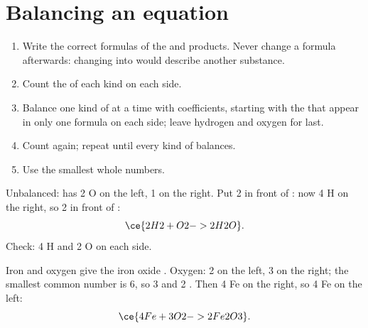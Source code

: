 \section{Balancing an equation}

\begin{method}\label{met:g8:balanced-equations:balance}
\begin{enumerate}
  \item Write the correct formulas of the  and products. Never
        change a formula afterwards: changing  into 
        would describe another substance.
  \item Count the  of each kind on each side.
  \item Balance one kind of  at a time with coefficients, starting
        with the  that appear in only one formula on each side;
        leave hydrogen and oxygen for last.
  \item Count again; repeat until every kind of  balances.
  \item Use the smallest whole numbers.
\end{enumerate}
\end{method}

\begin{example}\label{ex:g8:balanced-equations:water}
Unbalanced:  %
has 2 O on the left, 1 on the right. Put 2 in front of : now 4 H
on the right, so 2 in front of :
\[
  \ce{2H2 + O2 -> 2H2O}.
\]
Check: 4 H and 2 O on each side.
\end{example}

\begin{example}\label{ex:g8:balanced-equations:iron-oxide}
Iron and oxygen give the iron oxide . Oxygen: 2 on the left,
3 on the right; the smallest common number is 6, so 3  and 2
. Then 4 Fe on the right, so 4 Fe on the left:
\[
  \ce{4Fe + 3O2 -> 2Fe2O3}.
\]
\end{example}

